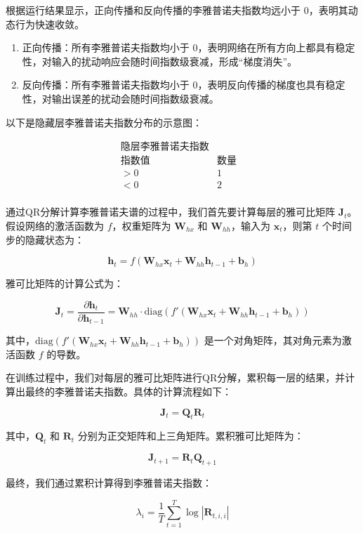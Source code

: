 \documentclass[12pt,a4paper]{amsart}
\begin{document}
根据运行结果显示，正向传播和反向传播的李雅普诺夫指数均远小于 0，表明其动态行为快速收敛。

\begin{enumerate}
   \item 正向传播：所有李雅普诺夫指数均小于 0，表明网络在所有方向上都具有稳定性，对输入的扰动响应会随时间指数级衰减，形成“梯度消失”。
   \item 反向传播：所有李雅普诺夫指数均小于 0，表明反向传播的梯度也具有稳定性，对输出误差的扰动会随时间指数级衰减。
\end{enumerate}

以下是隐藏层李雅普诺夫指数分布的示意图：

\[
\begin{array}{ccc}
\text{隐层李雅普诺夫指数} & & \\
\hline
\text{指数值} & \text{数量} \\
\hline
>0 & 1 \\
<0 & 2 \\
\end{array}
\]

通过QR分解计算李雅普诺夫谱的过程中，我们首先要计算每层的雅可比矩阵 \(\mathbf{J}_t\)。假设网络的激活函数为 \( f \)，权重矩阵为 \(\mathbf{W}_{hx}\) 和 \(\mathbf{W}_{hh}\)，输入为 \(\mathbf{x}_t\)，则第 \(t\) 个时间步的隐藏状态为：

\[
\mathbf{h}_t = f(\mathbf{W}_{hx} \mathbf{x}_t + \mathbf{W}_{hh} \mathbf{h}_{t-1} + \mathbf{b}_h)
\]

雅可比矩阵的计算公式为：

\[
\mathbf{J}_t = \frac{\partial \mathbf{h}_t}{\partial \mathbf{h}_{t-1}} = \mathbf{W}_{hh} \cdot \text{diag}(f'(\mathbf{W}_{hx} \mathbf{x}_t + \mathbf{W}_{hh} \mathbf{h}_{t-1} + \mathbf{b}_h))
\]

其中，\(\text{diag}(f'(\mathbf{W}_{hx} \mathbf{x}_t + \mathbf{W}_{hh} \mathbf{h}_{t-1} + \mathbf{b}_h))\) 是一个对角矩阵，其对角元素为激活函数 \(f\) 的导数。

在训练过程中，我们对每层的雅可比矩阵进行QR分解，累积每一层的结果，并计算出最终的李雅普诺夫指数。具体的计算流程如下：

\[
\mathbf{J}_t = \mathbf{Q}_t \mathbf{R}_t
\]

其中，\(\mathbf{Q}_t\) 和 \(\mathbf{R}_t\) 分别为正交矩阵和上三角矩阵。累积雅可比矩阵为：

\[
\mathbf{J}_{t+1} = \mathbf{R}_t \mathbf{Q}_{t+1}
\]

最终，我们通过累积计算得到李雅普诺夫指数：

\[
\lambda_i = \frac{1}{T} \sum_{t=1}^T \log |\mathbf{R}_{t,i,i}|
\]
\end{document}
